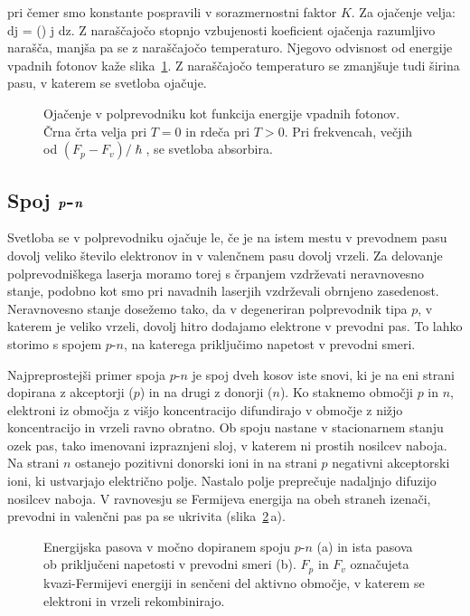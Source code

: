 \label{eq:gainSC}
\eeq
pri čemer smo konstante pospravili v sorazmernostni faktor $K$. Za ojačenje velja:
\beq
dj = \gamma(\omega) j dz.
\eeq
Z naraščajočo stopnjo vzbujenosti 
koeficient ojačenja razumljivo narašča, manjša pa se z naraščajočo 
temperaturo. Njegovo odvisnost od energije vpadnih fotonov kaže slika~\ref{s6.11}. Z
naraščajočo temperaturo se zmanjšuje tudi širina pasu, v katerem se svetloba ojačuje.
\begin{figure}[ht]
\centering
\def\svgwidth{55truemm} 

\caption{Ojačenje v polprevodniku kot funkcija energije vpadnih fotonov. Črna črta
velja pri $T=0$ in rdeča pri $T>0$. Pri frekvencah, večjih od $(F_p-F_v)/\hslash$,
se svetloba absorbira. 
}
\label{s6.11}
\end{figure}

\subsection*{Spoj $\textbf{\textit{p}}$-$\textbf{\textit{n}}$}
Svetloba se v polprevodniku ojačuje le, če je na istem mestu v prevodnem pasu
dovolj veliko število elektronov in v valenčnem pasu dovolj vrzeli. Za delovanje
polprevodniškega laserja moramo torej s črpanjem vzdrževati neravnovesno stanje, 
podobno kot smo pri navadnih laserjih vzdrževali obrnjeno zasedenost. 
Neravnovesno stanje dosežemo tako, da v degeneriran pol\-pre\-vod\-nik tipa $p$, v
katerem je veliko vrzeli, dovolj hitro dodajamo elektrone v prevodni pas. To lahko storimo s spojem
$p$-$n$, na katerega priključimo napetost v prevodni smeri. 

Najpreprostejši primer spoja $p$-$n$ je spoj dveh kosov iste snovi, ki je
na eni strani dopirana z akceptorji ($p$) in na drugi z donorji ($n$). 
Ko staknemo območji $p$ in $n$, elektroni iz območja z višjo koncentracijo 
difundirajo v območje z nižjo koncentracijo in vrzeli ravno obratno. 
Ob spoju nastane v stacionarnem stanju ozek pas, tako imenovani izpraznjeni sloj, 
v katerem ni prostih nosilcev naboja. Na strani $n$ ostanejo pozitivni donorski ioni in 
na strani $p$ negativni akceptorski ioni, ki ustvarjajo električno polje. 
Nastalo polje preprečuje nadaljnjo difuzijo nosilcev naboja. 
V ravnovesju se Fermijeva energija na obeh straneh izenači, 
prevodni in valenčni pas pa se ukrivita (slika~\ref{fig:pnlaser}\,a).
\begin{figure}[ht]
\centering
\def\svgwidth{128truemm} 

\caption{Energijska pasova v močno dopiranem spoju $p$-$n$ (a) in 
ista pasova ob priključeni napetosti v prevodni smeri (b). $F_p$ in $F_v$
označujeta kvazi-Fermijevi energiji in senčeni del aktivno območje, 
v katerem se elektroni in vrzeli rekombinirajo.
}
\label{fig:pnlaser}
\end{figure}

